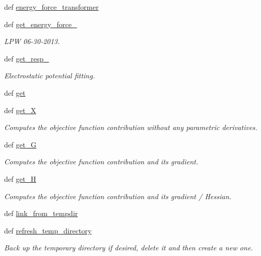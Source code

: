\begin{DoxyCompactItemize}
def \hyperlink{classforcebalance_1_1abinitio_1_1AbInitio_a9167da321a9fff748eef5ebe754cc7ca}{energy\-\_\-force\-\_\-transformer}
\item 
def \hyperlink{classforcebalance_1_1abinitio_1_1AbInitio_a313c848f46579817803c8a3ff100974e}{get\-\_\-energy\-\_\-force\-\_\-}
\begin{DoxyCompactList}\small\item\em L\-P\-W 06-\/30-\/2013. \end{DoxyCompactList}\item 
def \hyperlink{classforcebalance_1_1abinitio_1_1AbInitio_abfe50569805218075c5942fd3be8bbe7}{get\-\_\-resp\-\_\-}
\begin{DoxyCompactList}\small\item\em Electrostatic potential fitting. \end{DoxyCompactList}\item 
def \hyperlink{classforcebalance_1_1abinitio_1_1AbInitio_a2bb3ed7209707f688ec8b731392466b5}{get}
\item 
def \hyperlink{classforcebalance_1_1target_1_1Target_a606dd136f195c267c05a2455405e5949}{get\-\_\-\-X}
\begin{DoxyCompactList}\small\item\em Computes the objective function contribution without any parametric derivatives. \end{DoxyCompactList}\item 
def \hyperlink{classforcebalance_1_1target_1_1Target_afa8cc38c8bba8861c072e789717aa049}{get\-\_\-\-G}
\begin{DoxyCompactList}\small\item\em Computes the objective function contribution and its gradient. \end{DoxyCompactList}\item 
def \hyperlink{classforcebalance_1_1target_1_1Target_a1d2ee27fe86a09769c1816af23b09adb}{get\-\_\-\-H}
\begin{DoxyCompactList}\small\item\em Computes the objective function contribution and its gradient / Hessian. \end{DoxyCompactList}\item 
def \hyperlink{classforcebalance_1_1target_1_1Target_a5aa4958cea0a48138511567a076c5a82}{link\-\_\-from\-\_\-tempdir}
\item 
def \hyperlink{classforcebalance_1_1target_1_1Target_afe815eafab06ac92f10bbf4b88ad95c8}{refresh\-\_\-temp\-\_\-directory}
\begin{DoxyCompactList}\small\item\em Back up the temporary directory if desired, delete it and then create a new one. \end{DoxyCompactList}\item 

\end{DoxyCompactItemize}
